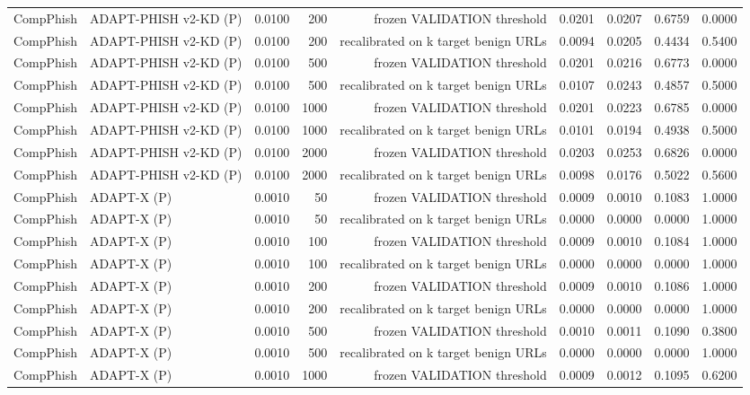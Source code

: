 \begin{table}[t]
\begin{tabular}{llrrrrrrr}
CompPhish & ADAPT-PHISH v2-KD (P) & 0.0100 & 200 & frozen VALIDATION threshold & 0.0201 & 0.0207 & 0.6759 & 0.0000 \\
CompPhish & ADAPT-PHISH v2-KD (P) & 0.0100 & 200 & recalibrated on k target benign URLs & 0.0094 & 0.0205 & 0.4434 & 0.5400 \\
CompPhish & ADAPT-PHISH v2-KD (P) & 0.0100 & 500 & frozen VALIDATION threshold & 0.0201 & 0.0216 & 0.6773 & 0.0000 \\
CompPhish & ADAPT-PHISH v2-KD (P) & 0.0100 & 500 & recalibrated on k target benign URLs & 0.0107 & 0.0243 & 0.4857 & 0.5000 \\
CompPhish & ADAPT-PHISH v2-KD (P) & 0.0100 & 1000 & frozen VALIDATION threshold & 0.0201 & 0.0223 & 0.6785 & 0.0000 \\
CompPhish & ADAPT-PHISH v2-KD (P) & 0.0100 & 1000 & recalibrated on k target benign URLs & 0.0101 & 0.0194 & 0.4938 & 0.5000 \\
CompPhish & ADAPT-PHISH v2-KD (P) & 0.0100 & 2000 & frozen VALIDATION threshold & 0.0203 & 0.0253 & 0.6826 & 0.0000 \\
CompPhish & ADAPT-PHISH v2-KD (P) & 0.0100 & 2000 & recalibrated on k target benign URLs & 0.0098 & 0.0176 & 0.5022 & 0.5600 \\
CompPhish & ADAPT-X (P) & 0.0010 & 50 & frozen VALIDATION threshold & 0.0009 & 0.0010 & 0.1083 & 1.0000 \\
CompPhish & ADAPT-X (P) & 0.0010 & 50 & recalibrated on k target benign URLs & 0.0000 & 0.0000 & 0.0000 & 1.0000 \\
CompPhish & ADAPT-X (P) & 0.0010 & 100 & frozen VALIDATION threshold & 0.0009 & 0.0010 & 0.1084 & 1.0000 \\
CompPhish & ADAPT-X (P) & 0.0010 & 100 & recalibrated on k target benign URLs & 0.0000 & 0.0000 & 0.0000 & 1.0000 \\
CompPhish & ADAPT-X (P) & 0.0010 & 200 & frozen VALIDATION threshold & 0.0009 & 0.0010 & 0.1086 & 1.0000 \\
CompPhish & ADAPT-X (P) & 0.0010 & 200 & recalibrated on k target benign URLs & 0.0000 & 0.0000 & 0.0000 & 1.0000 \\
CompPhish & ADAPT-X (P) & 0.0010 & 500 & frozen VALIDATION threshold & 0.0010 & 0.0011 & 0.1090 & 0.3800 \\
CompPhish & ADAPT-X (P) & 0.0010 & 500 & recalibrated on k target benign URLs & 0.0000 & 0.0000 & 0.0000 & 1.0000 \\
CompPhish & ADAPT-X (P) & 0.0010 & 1000 & frozen VALIDATION threshold & 0.0009 & 0.0012 & 0.1095 & 0.6200 \\

\end{tabular}
\end{table}
